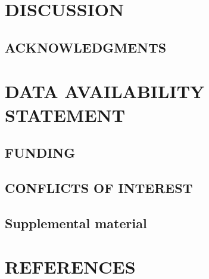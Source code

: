 \documentclass{asm-article}
\begin{document}
\section{DISCUSSION}


\begin{acknowledgments}
\section{ACKNOWLEDGMENTS}





\end{acknowledgments}


\section{DATA AVAILABILITY STATEMENT}




\begin{funding}
\section{FUNDING}


\end{funding}

\begin{conflictsinterest}
\section{CONFLICTS OF INTEREST}



\end{conflictsinterest}

\subsection{Supplemental material}



\newpage
\section{REFERENCES}

\end{document}
